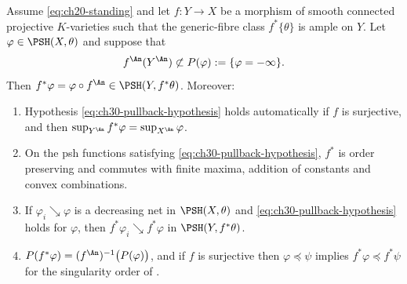 \begin{theorem}
\label{thm:ch30-pullback-psh}
Assume \eqref{eq:ch20-standing} and let $f:Y\to X$ be a morphism of smooth
connected projective $K$-varieties such that the generic-fibre class
$f^*\{\theta\}$ is ample on $Y$.  Let
$\varphi\in\PSH(X,\theta)$ and suppose that
\begin{equation}
\label{eq:ch30-pullback-hypothesis}
 f^{\An}(Y^{\An})\not\subset P(\varphi):=\{\varphi=-\infty\}.
\end{equation}
Then $f^*\varphi=\varphi\circ f^{\An}\in\PSH(Y,f^*\theta)$.  Moreover:
\begin{enumerate}
\item\label{itm:ch30-pbpsh:surj}
Hypothesis \eqref{eq:ch30-pullback-hypothesis} holds automatically if
$f$ is surjective, and then
$\sup_{Y^{\An}}f^*\varphi=\sup_{X^{\An}}\varphi$.
\item\label{itm:ch30-pbpsh:order}
On the psh functions satisfying
\eqref{eq:ch30-pullback-hypothesis}, $f^*$ is order preserving and
commutes with finite maxima, addition of constants and convex combinations.
\item\label{itm:ch30-pbpsh:decreasing}
If $\varphi_i\searrow\varphi$ is a decreasing net in $\PSH(X,\theta)$
and \eqref{eq:ch30-pullback-hypothesis} holds for $\varphi$, then
$f^*\varphi_i\searrow f^*\varphi$ in $\PSH(Y,f^*\theta)$.
\item\label{itm:ch30-pbpsh:polar}
$P(f^*\varphi)=(f^{\An})^{-1}\bigl(P(\varphi)\bigr)$, and if $f$ is
surjective then $\varphi\preceq\psi$ implies
$f^*\varphi\preceq f^*\psi$ for the singularity order of
.
\end{enumerate}
\end{theorem}

